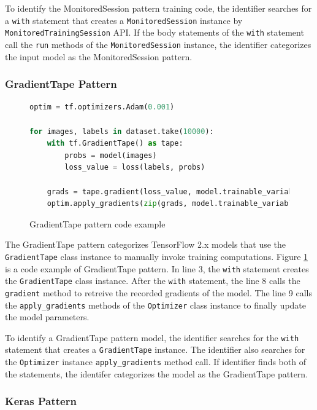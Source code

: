 To identify the MonitoredSession pattern training code,
the identifier searches for a {\tt with} statement that creates a
{\tt MonitoredSession} instance by {\tt MonitoredTrainingSession} API.
If the body statements of the {\tt with} statement call the {\tt run} methods 
of the {\tt MonitoredSession} instance, 
the identifier categorizes the input model as the MonitoredSession pattern. 


\subsubsection{GradientTape Pattern}

\begin{figure}[!ht]
  \begin{lstlisting}[language=Python]
optim = tf.optimizers.Adam(0.001)

for images, labels in dataset.take(10000):
    with tf.GradientTape() as tape:
        probs = model(images)
        loss_value = loss(labels, probs)

    grads = tape.gradient(loss_value, model.trainable_variables)
    optim.apply_gradients(zip(grads, model.trainable_variables))
  \end{lstlisting}
  \caption{GradientTape pattern code example}
  \label{fig:tapepattern}
\end{figure}


The GradientTape pattern categorizes TensorFlow 2.x models that
use the {\tt GradientTape} class instance to manually invoke training 
computations. Figure \ref{fig:tapepattern} is a code example of 
GradientTape pattern.
In line 3, the {\tt with} statement creates the {\tt GradientTape} class
instance. 
After the {\tt with} statement, the line 8 calls the {\tt gradient} method
to retreive the recorded gradients of the model.
The line 9 calls the {\tt apply\_gradients} methods of the {\tt Optimizer}
class instance to finally update the model parameters.

To identify a GradientTape pattern model,
the identifier searches for the {\tt with} statement that creates a
{\tt GradientTape} instance.
The identifier also searches for the {\tt Optimizer} instance 
{\tt apply\_gradients} method call.
If identifier finds both of the statements, the identifer categorizes the
model as the GradientTape pattern.


\subsubsection{Keras Pattern}\label{sec:keras}


